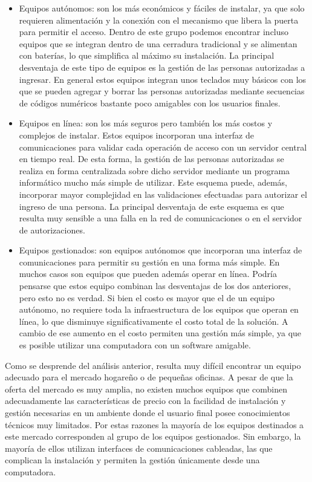 \begin{itemize}
	\item Equipos autónomos: son los más económicos y fáciles de instalar, ya que solo requieren alimentación y la conexión con el mecanismo que libera la puerta para permitir el acceso. Dentro de este grupo podemos encontrar incluso equipos que se integran dentro de una cerradura tradicional y se alimentan con baterías, lo que simplifica al máximo su instalación. La principal desventaja de este tipo de equipos es la gestión de las personas autorizadas a ingresar. En general estos equipos integran unos teclados muy básicos con los que se pueden agregar y borrar las personas autorizadas mediante secuencias de códigos numéricos bastante poco amigables con los usuarios finales.
	\item Equipos en línea: son los más seguros pero también los más costos y complejos de instalar. Estos equipos incorporan una interfaz de comunicaciones para validar cada operación de acceso con un servidor central en tiempo real. De esta forma, la gestión de las personas autorizadas se realiza en forma centralizada sobre dicho servidor mediante un programa informático mucho más simple de utilizar. Este esquema puede, además, incorporar mayor complejidad en las validaciones efectuadas para autorizar el ingreso de una persona. La principal desventaja de este esquema es que resulta muy sensible a una falla en la red de comunicaciones o en el servidor de autorizaciones.
	\item Equipos gestionados: son equipos autónomos que incorporan una interfaz de comunicaciones para permitir su gestión en una forma más simple. En muchos casos son equipos que pueden además operar en línea. Podría pensarse que estos equipo combinan las desventajas de los dos anteriores, pero esto no es verdad. Si bien el costo es mayor que el de un equipo autónomo,  no requiere toda la infraestructura de los equipos que operan en línea, lo que disminuye significativamente el costo total de la solución. A cambio de ese aumento en el costo permiten una gestión más simple, ya que es posible utilizar una computadora con un software amigable.
\end{itemize}

Como se desprende del análisis anterior, resulta muy difícil encontrar un equipo adecuado para el mercado hogareño o de pequeñas oficinas. A pesar de que la oferta del mercado es muy amplia, no existen muchos equipos que combinen adecuadamente las características de precio con la facilidad de instalación y gestión necesarias en un ambiente donde el usuario final posee conocimientos técnicos muy limitados. Por estas razones la mayoría de los equipos destinados a este mercado corresponden al grupo de los equipos gestionados. Sin embargo, la mayoría de ellos utilizan interfaces de comunicaciones cableadas, las que complican la instalación y permiten la gestión únicamente desde una computadora.

